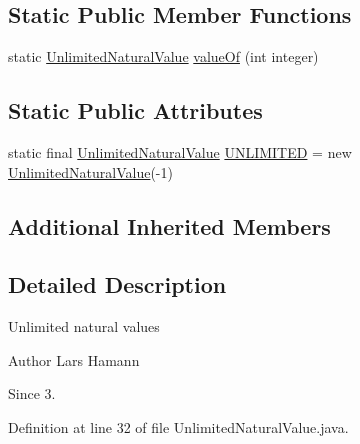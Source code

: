 \subsection*{Static Public Member Functions}
\begin{DoxyCompactItemize}
\item 
static \hyperlink{classorg_1_1tzi_1_1use_1_1uml_1_1ocl_1_1value_1_1_unlimited_natural_value}{Unlimited\-Natural\-Value} \hyperlink{classorg_1_1tzi_1_1use_1_1uml_1_1ocl_1_1value_1_1_unlimited_natural_value_a0a3cac4f625c24a5479e551aa49ad765}{value\-Of} (int integer)
\end{DoxyCompactItemize}
\subsection*{Static Public Attributes}
\begin{DoxyCompactItemize}
\item 
static final \hyperlink{classorg_1_1tzi_1_1use_1_1uml_1_1ocl_1_1value_1_1_unlimited_natural_value}{Unlimited\-Natural\-Value} \hyperlink{classorg_1_1tzi_1_1use_1_1uml_1_1ocl_1_1value_1_1_unlimited_natural_value_add14d1105560884a59ccecb32a023090}{U\-N\-L\-I\-M\-I\-T\-E\-D} = new \hyperlink{classorg_1_1tzi_1_1use_1_1uml_1_1ocl_1_1value_1_1_unlimited_natural_value}{Unlimited\-Natural\-Value}(-\/1)
\end{DoxyCompactItemize}
\subsection*{Additional Inherited Members}


\subsection{Detailed Description}
Unlimited natural values \begin{DoxyAuthor}{Author}
Lars Hamann 
\end{DoxyAuthor}
\begin{DoxySince}{Since}
3. 
\end{DoxySince}


Definition at line 32 of file Unlimited\-Natural\-Value.\-java.



